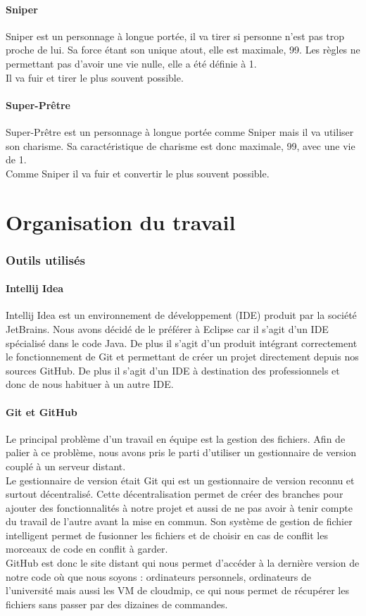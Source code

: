 \documentclass{article}
\begin{document}
\subsection{Sniper}
Sniper est un personnage à longue portée, il va tirer si personne n'est pas trop proche de lui. Sa force étant son unique atout, elle est maximale, 99. Les règles ne permettant pas d'avoir une vie nulle, elle a été définie à 1.\\
Il va fuir et tirer le plus souvent possible.

\subsection{Super-Prêtre}
Super-Prêtre est un personnage à longue portée comme Sniper mais il va utiliser son charisme. Sa caractéristique de charisme est donc maximale, 99, avec une vie de 1.\\
Comme Sniper il va fuir et convertir le plus souvent possible.


\setcounter{section}{0}
\part{Organisation du travail}
\section{Outils utilisés}
\subsection{Intellij Idea}
Intellij Idea est un environnement de développement (IDE) produit par la société JetBrains. Nous avons décidé de le préférer à Eclipse car il s'agit d'un IDE spécialisé dans le code Java. De plus il s'agit d'un produit intégrant correctement le fonctionnement de Git et permettant de créer un projet directement depuis nos sources GitHub. De plus il s'agit d'un IDE à destination des professionnels et donc de nous habituer à un autre IDE.

\subsection{Git et GitHub}
Le principal problème d'un travail en équipe est la gestion des fichiers. Afin de palier à ce problème, nous avons pris le parti d'utiliser un gestionnaire de version couplé à un serveur distant.\\
Le gestionnaire de version était Git qui est un gestionnaire de version reconnu et surtout décentralisé. Cette décentralisation permet de créer des branches pour ajouter des fonctionnalités à notre projet et aussi de ne pas avoir à tenir compte du travail de l'autre avant la mise en commun. Son système de gestion de fichier intelligent permet de fusionner les fichiers et de choisir en cas de conflit les morceaux de code en conflit à garder.\\
GitHub est donc le site distant qui nous permet d'accéder à la dernière version de notre code où que nous soyons : ordinateurs personnels, ordinateurs de l'université mais aussi les VM de cloudmip, ce qui nous permet de récupérer les fichiers sans passer par des dizaines de commandes.
\end{document}
